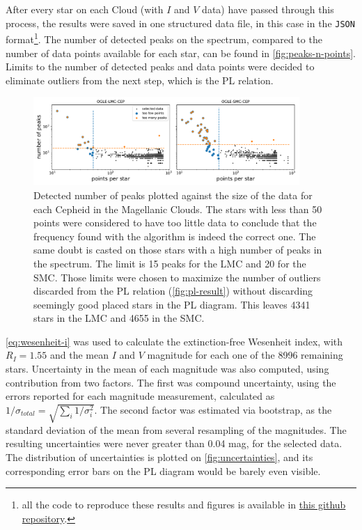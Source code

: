 After every star on each Cloud (with $I$ and $V$ data) have passed through this process, the results were saved in one structured data file, in this case in the \texttt{JSON} format\footnote{
	all the code to reproduce these results and figures is available in \href{https://github.com/JacobHilbert/another-spectrum/}{this github repository}.
}.
The number of detected peaks on the spectrum, compared to the number of data points available for each star, can be found in \autoref{fig:peaks-n-points}.
Limits to the number of detected peaks and data points were decided to eliminate outliers from the next step, which is the PL relation.

\begin{figure}
	\centering
	\includegraphics[width=0.9\textwidth]{img/peaks_vs_points.pdf}
	\caption[Results: detected number of peaks against data size]{
		Detected number of peaks plotted against the size of the data for each Cepheid in the Magellanic Clouds.
		The stars with less than 50 points were considered to have too little data to conclude that the frequency found with the algorithm is indeed the correct one.
		The same doubt is casted on those stars with a high number of peaks in the spectrum. The limit is 15 peaks for the LMC and 20 for the SMC.
		Those limits were chosen to maximize the number of outliers discarded from the PL relation (\autoref{fig:pl-result}) without discarding seemingly good placed stars in the PL diagram.
		This leaves 4341 stars in the LMC and 4655 in the SMC.
	}
	\label{fig:peaks-n-points}
\end{figure}


\autoref{eq:wesenheit-i} was used to calculate the extinction-free Wesenheit index, 
with $R_I=1.55$ \citep{OGLE2015,Ulaczyk2013} and the mean $I$ and $V$ magnitude for each one of the 8996 remaining stars.
Uncertainty in the mean of each magnitude was also computed, using contribution from two factors.
The first was compound uncertainty, using the errors reported for each magnitude measurement, calculated as $1/\sigma_{total}=\sqrt{\sum_i 1/\sigma_i^2}$.
The second factor was estimated via bootstrap, as the standard deviation of the mean from several resampling of the magnitudes.
The resulting uncertainties were never greater than 0.04 mag, for the selected data. 
The distribution of uncertainties is plotted on \autoref{fig:uncertainties}, 
and its corresponding error bars on the PL diagram would be barely even visible.

